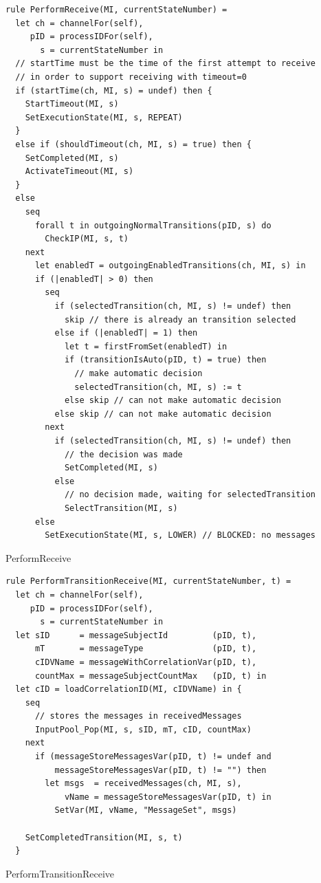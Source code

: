 \begin{listing}[H]
\begin{verbatim}
rule PerformReceive(MI, currentStateNumber) =
  let ch = channelFor(self),
     pID = processIDFor(self),
       s = currentStateNumber in
  // startTime must be the time of the first attempt to receive
  // in order to support receiving with timeout=0
  if (startTime(ch, MI, s) = undef) then {
    StartTimeout(MI, s)
    SetExecutionState(MI, s, REPEAT)
  }
  else if (shouldTimeout(ch, MI, s) = true) then {
    SetCompleted(MI, s)
    ActivateTimeout(MI, s)
  }
  else
    seq
      forall t in outgoingNormalTransitions(pID, s) do
        CheckIP(MI, s, t)
    next
      let enabledT = outgoingEnabledTransitions(ch, MI, s) in
      if (|enabledT| > 0) then
        seq
          if (selectedTransition(ch, MI, s) != undef) then
            skip // there is already an transition selected
          else if (|enabledT| = 1) then
            let t = firstFromSet(enabledT) in
            if (transitionIsAuto(pID, t) = true) then
              // make automatic decision
              selectedTransition(ch, MI, s) := t
            else skip // can not make automatic decision
          else skip // can not make automatic decision
        next
          if (selectedTransition(ch, MI, s) != undef) then
            // the decision was made
            SetCompleted(MI, s)
          else
            // no decision made, waiting for selectedTransition
            SelectTransition(MI, s)
      else
        SetExecutionState(MI, s, LOWER) // BLOCKED: no messages
\end{verbatim}
\caption{PerformReceive}
\label{lst:asm:PerformReceive}
\end{listing}


\begin{listing}[H]
\begin{verbatim}
rule PerformTransitionReceive(MI, currentStateNumber, t) =
  let ch = channelFor(self),
     pID = processIDFor(self),
       s = currentStateNumber in
  let sID      = messageSubjectId         (pID, t),
      mT       = messageType              (pID, t),
      cIDVName = messageWithCorrelationVar(pID, t),
      countMax = messageSubjectCountMax   (pID, t) in
  let cID = loadCorrelationID(MI, cIDVName) in {
    seq
      // stores the messages in receivedMessages
      InputPool_Pop(MI, s, sID, mT, cID, countMax)
    next
      if (messageStoreMessagesVar(pID, t) != undef and
          messageStoreMessagesVar(pID, t) != "") then
        let msgs  = receivedMessages(ch, MI, s),
            vName = messageStoreMessagesVar(pID, t) in
          SetVar(MI, vName, "MessageSet", msgs)

    SetCompletedTransition(MI, s, t)
  }
\end{verbatim}
\caption{PerformTransitionReceive}
\label{lst:asm:PerformTransitionReceive}
\end{listing}




